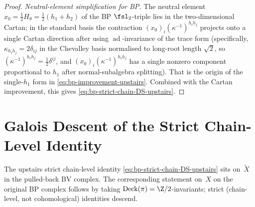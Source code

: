 \begin{proof}
\emph{Neutral-element simplification for BP.}
The neutral
element $x_0 = \tfrac{1}{2} H_{\theta} = \tfrac{1}{2}(h_1 + h_2)$ of
the BP $\fsl_2$-triple lies in the two-dimensional Cartan; in the
standard basis the contraction
$(x_0)_i (\kappa^{-1})^{h_i h_j}$ projects onto a single Cartan
direction after using
$\operatorname{ad}$-invariance of the trace form (specifically,
$\kappa_{h_i h_j} = 2\delta_{ij}$ in the Chevalley basis normalised to long-root length $\sqrt 2$, so $(\kappa^{-1})^{h_i h_j} = \tfrac 12 \delta^{ij}$, and
$(x_0)_i (\kappa^{-1})^{h_i h_j}$ has a single nonzero component
proportional to $h_1$ after normal-subalgebra splitting). That is
the origin of the single-$h_1$ form in
\eqref{eq:bp-improvement-upstairs}. Combined with the Cartan
improvement, this
gives \eqref{eq:bp-strict-chain-DS-upstairs}.
\end{proof}

\section{Galois Descent of the Strict Chain-Level Identity}
\label{sec:bp-galois-descent}

The upstairs strict chain-level identity
\eqref{eq:bp-strict-chain-DS-upstairs} sits on~$\widetilde X$ in the
pulled-back BV complex. The corresponding statement on~$X$ on the
original BP complex follows by taking $\mathrm{Deck}(\pi) = \Z/2$-invariants;
strict (chain-level, not cohomological) identities descend.

